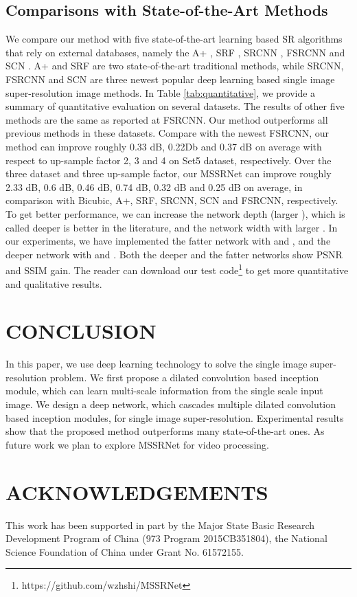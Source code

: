 \documentclass{article}
\begin{document}
\subsection{Comparisons with State-of-the-Art Methods}
\label{subsec:comparisons}

We compare our method with five state-of-the-art learning based SR algorithms that rely on external databases, namely the A+ \cite{ref22}, SRF \cite{ref23}, SRCNN \cite{ref4,ref5}, FSRCNN \cite{ref7} and SCN \cite{ref24}. A+ and SRF are two state-of-the-art traditional methods, while SRCNN, FSRCNN and SCN are three newest popular deep learning based single image super-resolution image methods. In Table \ref{tab:quantitative}, we provide a summary of quantitative evaluation on several datasets. The results of other five methods are the same as reported at FSRCNN. Our method outperforms all previous methods in these datasets. Compare with the newest FSRCNN, our method can improve roughly 0.33 dB, 0.22Db and 0.37 dB on average with respect to up-sample factor 2, 3 and 4 on Set5 dataset, respectively. Over the three dataset and three up-sample factor, our MSSRNet can improve roughly 2.33 dB, 0.6 dB, 0.46 dB, 0.74 dB, 0.32 dB and 0.25 dB on average, in comparison with Bicubic, A+, SRF, SRCNN, SCN and FSRCNN, respectively. To get better performance, we can increase the network depth (larger ), which is called deeper is better in the literature, and the network width with larger . In our experiments, we have implemented the fatter network with  and , and the deeper network with  and . Both the deeper and the fatter networks show PSNR and SSIM gain. The reader can download our test code\footnote{https://github.com/wzhshi/MSSRNet}  to get more quantitative and qualitative results.

\section{CONCLUSION}
\label{sec:conclution}

In this paper, we use deep learning technology to solve the single image super-resolution problem. We first propose a dilated convolution based inception module, which can learn multi-scale information from the single scale input image. We design a deep network, which cascades multiple dilated convolution based inception modules, for single image super-resolution. Experimental results show that the proposed method outperforms many state-of-the-art ones. As future work we plan to explore MSSRNet for video processing.

\section{ACKNOWLEDGEMENTS}
\label{sec:acknowledgements}

This work has been supported in part by the Major State Basic Research Development Program of China (973 Program 2015CB351804), the National Science Foundation of China under Grant No. 61572155.





\end{document}
